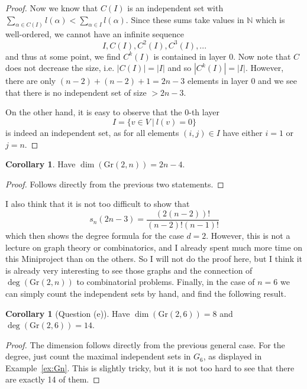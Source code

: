 \documentclass{scrartcl}
\newcommand{\N}{\mathbb{N}}
\newcommand{\Gr}{\mathrm{Gr}}
\theoremstyle{definition}
\newtheorem{corollary}[subsection]{Corollary}
\begin{document}
\begin{proof}
    Now we know that $C(I)$ is an independent set with $\sum_{\alpha \in C(I)} l(\alpha) < \sum_{\alpha \in I} l(\alpha)$.
    Since these sums take values in $\N$ which is well-ordered, we cannot have an infinite sequence
    \begin{equation*}
        I, C(I), C^2(I), C^3(I), ...
    \end{equation*}
    and thus at some point, we find $C^k(I)$ is contained in layer 0.
    Now note that $C$ does not decrease the size, i.e. $|C(I)| = |I|$ and so $|C^k(I)| = |I|$.
    However, there are only $(n - 2) + (n - 2) + 1 = 2n - 3$ elements in layer 0 and we see that there is no independent set of size $> 2n - 3$.

    On the other hand, it is easy to observe that the 0-th layer
    \begin{equation*}
        I = \{ v \in V \ | \ l(v) = 0 \}
    \end{equation*}
    is indeed an independent set, as for all elements $(i, j) \in I$ have either $i = 1$ or $j = n$.
\end{proof}
\begin{corollary}
    Have $\dim(\Gr(2, n)) = 2n - 4$.
\end{corollary}
\begin{proof}
    Follows directly from the previous two statements.
\end{proof}
I also think that it is not too difficult to show that
\begin{equation*}
    s_n(2n - 3) = \frac {(2(n - 2))!} {(n - 2)! (n - 1)!}
\end{equation*}
which then shows the degree formula for the case $d = 2$.
However, this is not a lecture on graph theory or combinatorics, and I already spent much more time on this Miniproject than on the others.
So I will not do the proof here, but I think it is already very interesting to see those graphs and the connection of $\deg(\Gr(2, n))$ to combinatorial problems.
Finally, in the case of $n = 6$ we can simply count the independent sets by hand, and find the following result.
\begin{corollary}[Question (e)]
    Have $\dim(\Gr(2, 6)) = 8$ and $\deg(\Gr(2, 6)) = 14$.
\end{corollary}
\begin{proof}
    The dimension follows directly from the previous general case.
    For the degree, just count the maximal independent sets in $G_6$, as displayed in Example~\ref{ex:Gn}.
    This is slightly tricky, but it is not too hard to see that there are exactly 14 of them.
\end{proof}
\end{document}
